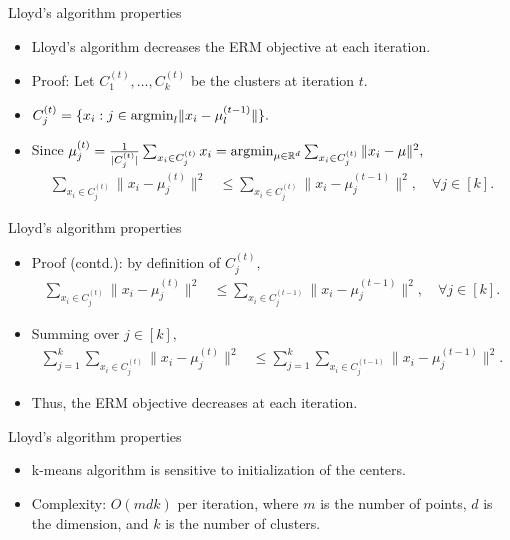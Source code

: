 \documentclass[final]{beamer}
\begin{document}
\begin{frame}{Lloyd's algorithm properties}
	\begin{itemize}
		\item Lloyd's algorithm decreases the ERM objective at each iteration.
		\pause
	\item Proof: Let $C_1^{(t)}, \ldots, C_k^{(t)}$ be the clusters at iteration $t.$  
	\pause
	\item $C_j^{(t)} = \{x_i: j \in {\rm arg min}_l \|x_i - \mu_{l}^{(t-1)}\|\}.$
	\pause
\item Since $\mu_j^{(t)} = \frac{1}{|C_j^{(t)}|} \sum_{x_i \in C_j^{(t)}} x_i = {\rm arg min}_{\mu \in \mathbb{R}^d} \sum_{x_i \in C_j^{(t)}} \|x_i - \mu\|^2,$
		\begin{align*}
		\sum_{x_i \in C_j^{(t)}} \|x_i - \mu_j^{(t)}\|^2 &\leq \sum_{x_i \in C_j^{(t)}} \|x_i - \mu_{j}^{(t-1)}\|^2, \quad \forall j \in [k].
		\end{align*}
	
	\end{itemize}
\end{frame}
\begin{frame}{Lloyd's algorithm properties}
	\begin{itemize}
		\item Proof (contd.): by definition of $C_j^{(t)},$
		\begin{align*}
		\sum_{x_i \in C_j^{(t)}} \|x_i - \mu_j^{(t)}\|^2 &\leq \sum_{x_i \in C_j^{(t-1)}} \|x_i - \mu_{j}^{(t-1)}\|^2, \quad \forall j \in [k].
		\end{align*}
		\pause
		\item Summing over $j \in [k],$ 
		\begin{align*}
		\sum_{j=1}^k \sum_{x_i \in C_j^{(t)}} \|x_i - \mu_j^{(t)}\|^2 &\leq \sum_{j=1}^k \sum_{x_i \in C_j^{(t-1)}} \|x_i - \mu_{j}^{(t-1)}\|^2.
		\end{align*}
		\pause
		\item Thus, the ERM objective decreases at each iteration.
	\end{itemize}
\end{frame}
\begin{frame}{Lloyd's algorithm properties}
	\begin{itemize}
		\item k-means algorithm is sensitive to initialization of the centers.
		\pause
		\item Complexity: $O(mdk)$ per iteration, where $m$ is the number of points, $d$ is the dimension, and $k$ is the number of clusters.	
	\end{itemize}
\end{frame}
\end{document}
